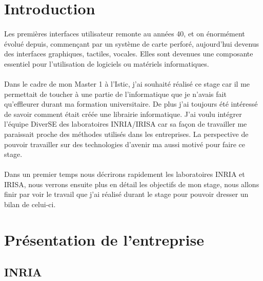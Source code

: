 \documentclass[11pt, a4paper, pdftex]{article}
\begin{document}
    \tableofcontents

    \newpage

    \section{Introduction}\label{sec:introduction}
        \paragraph{}
            Les premières interfaces utilisateur remonte au années 40, et on énormément évolué depuis, commençant par un système de carte perforé, aujourd'hui devenus des interfaces graphiques, tactiles, vocales.
            Elles sont devenues une composante essentiel pour l'utilisation de logiciels ou matériels informatiques. %

        \paragraph{}
            Dans le cadre de mon Master 1 à l'Istic, j'ai souhaité réalisé ce stage car il me permettait de toucher à une partie de l'informatique que je n'avais
            fait qu'effleurer durant ma formation universitaire.
            De plus j'ai toujours été intéressé de savoir comment était créée une librairie informatique.
            J'ai voulu intégrer l'équipe DiverSE des laboratoires INRIA/IRISA car sa façon de travailler me paraissait proche des méthodes utilisés dans les entreprises.
            La perspective de pouvoir travailler sur des technologies d'avenir ma aussi motivé pour faire ce stage.

        \paragraph{}
            Dans un premier temps nous décrirons rapidement les laboratoires INRIA et IRISA, nous verrons ensuite plus en détail les objectifs de mon stage,
            nous allons finir par voir le travail que j'ai réalisé durant le stage pour pouvoir dresser un bilan de celui-ci.
    \newpage
    \section{Présentation de l'entreprise}\label{sec:presentr}
    \vspace{1cm}
        \subsection{INRIA}\label{subsec:inria}
\end{document}
